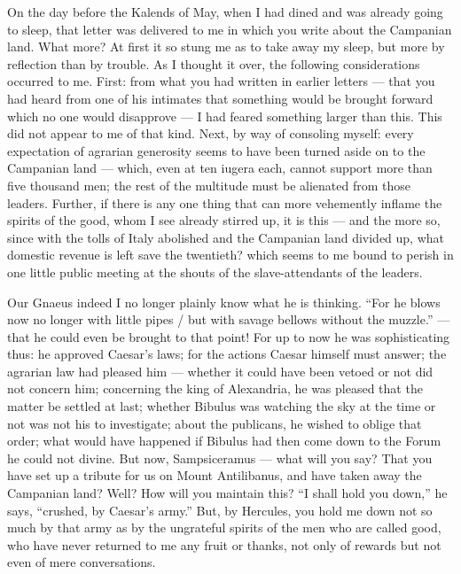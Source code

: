 

 On the day before the Kalends of May, when I had dined and was already going to sleep, that letter was delivered to me in which you write about the Campanian land. What more? At first it so stung me as to take away my sleep, but more by reflection than by trouble. As I thought it over, the following considerations occurred to me. First: from what you had written in earlier letters --- that you had heard from one of his intimates that something would be brought forward which no one would disapprove --- I had feared something larger than this. This did not appear to me of that kind. Next, by way of consoling myself: every expectation of agrarian generosity seems to have been turned aside on to the Campanian land --- which, even at ten iugera each, cannot support more than five thousand men; the rest of the multitude must be alienated from those leaders. Further, if there is any one thing that can more vehemently inflame the spirits of the good, whom I see already stirred up, it is this --- and the more so, since with the tolls of Italy abolished and the Campanian land divided up, what domestic revenue is left save the twentieth? which seems to me bound to perish in one little public meeting at the shouts of the slave-attendants of the leaders.

 Our Gnaeus indeed I no longer plainly know what he is thinking. ``For he blows now no longer with little pipes / but with savage bellows without the muzzle.'' --- that he could even be brought to that point! For up to now he was sophisticating thus: he approved Caesar's laws; for the actions Caesar himself must answer; the agrarian law had pleased him --- whether it could have been vetoed or not did not concern him; concerning the king of Alexandria, he was pleased that the matter be settled at last; whether Bibulus was watching the sky at the time or not was not his to investigate; about the publicans, he wished to oblige that order; what would have happened if Bibulus had then come down to the Forum he could not divine. But now, Sampsiceramus --- what will you say? That you have set up a tribute for us on Mount Antilibanus, and have taken away the Campanian land? Well? How will you maintain this? ``I shall hold you down,'' he says, ``crushed, by Caesar's army.'' But, by Hercules, you hold me down not so much by that army as by the ungrateful spirits of the men who are called good, who have never returned to me any fruit or thanks, not only of rewards but not even of mere conversations.

